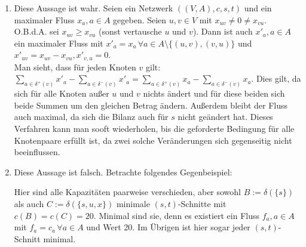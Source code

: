 \documentclass[a4paper,12pt,german]{scrartcl}
\begin{document}
\begin{enumerate}
  \item Diese Aussage ist wahr. Seien ein Netzwerk $((V,A),c,s,t)$ und ein maximaler Fluss $x_a,a\in A$ gegeben. Seien $u,v\in V$ mit $x_{uv}\neq0\neq x_{vu}$. O.B.d.A. sei $x_{uv}\geq x_{vu}$ (sonst vertausche $u$ und $v$). Dann ist auch $x'_{a},a\in A$ ein maximaler Fluss mit $x'_a=x_a\,\forall a\in A\setminus\{(u,v),(v,u)\}$ und $x'_{uv}=x_{uv}-x_{vu},x'_{v,u}=0$.\\
  Man sieht, dass für jeden Knoten $v$ gilt: $\sum\limits_{a\in\delta^+(v)}x'_a-\sum\limits_{a\in\delta^-(v)}x'_a=\sum\limits_{a\in\delta^+(v)}x_a-\sum\limits_{a\in\delta^-(v)}x_a$. Dies gilt, da sich für alle Knoten außer $u$ und $v$ nichts ändert und für diese beiden sich beide Summen um den gleichen Betrag ändern. Außerdem bleibt der Fluss auch maximal, da sich die Bilanz auch für $s$ nicht geändert hat. Dieses Verfahren kann man sooft wiederholen, bis die geforderte Bedingung für alle Knotenpaare erfüllt ist, da zwei solche Veränderungen sich gegenseitig nicht beeinflussen.
  \item Diese Aussage ist falsch. Betrachte folgendes Gegenbeispiel:
    \begin{center}
    \end{center}
    Hier sind alle Kapazitäten paarweise verschieden, aber sowohl $B:=\delta(\{s\})$ als auch $C:=\delta(\{s,u,x\})$ minimale $(s,t)$-Schnitte mit $c(B)=c(C)=20$. Minimal sind sie, denn es existiert ein Fluss $f_a,a\in A$ mit $f_a=c_a\,\forall a\in A$ und Wert 20. Im Übrigen ist hier sogar jeder $(s,t)$-Schnitt minimal.
    

\end{enumerate}
\end{document}
